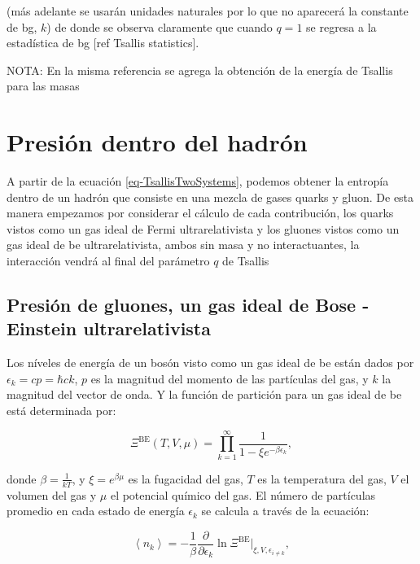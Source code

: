 (más adelante se usarán unidades naturales por lo que no aparecerá la constante de \acrshort{bg}, $k$) de donde se observa claramente que cuando $q=1$ se regresa a la estadística de \acrshort{bg} [ref Tsallis statistics].

NOTA: En la misma referencia se agrega la obtención de la energía de Tsallis para las masas

\section{Presión dentro del hadrón}\label{sec-PresTsa}

A partir de la ecuación \eqref{eq-TsallisTwoSystems}, podemos obtener la entropía dentro de un hadrón que consiste en una mezcla de gases quarks y gluon. De esta manera empezamos por considerar el cálculo de cada contribución, los quarks vistos como un gas ideal de Fermi ultrarelativista y los gluones vistos como un gas ideal de \acrfull{be}  ultrarelativista, ambos sin masa y no interactuantes, la interacción vendrá al final del parámetro $q$ de Tsallis

\subsection{Presión de gluones, un gas ideal de Bose - Einstein ultrarelativista}

Los níveles de energía de un bosón visto como un gas ideal de \acrshort{be} están dados por ${\epsilon}_{k}=cp=\hbar c k$, $p$ es la magnitud del momento de las partículas del gas, y $k$ la magnitud del vector de onda. Y la función de partición para un gas ideal de \acrshort{be} está determinada por:

\begin{equation}\label{eq-partfunc}
{\Xi}^{\mathrm{BE}}\left(T,V,\mu\right) = \prod_{k=1}^{\infty}\frac{1}{1-\xi {e}^{-\beta {\epsilon}_{k}}},
\end{equation}

donde $\beta = \frac{1}{kT}$, y ${\xi} = {e}^{\beta \mu}$ es la fugacidad del gas, $T$ es la temperatura del gas, $V$ el volumen del gas y $\mu$ el potencial químico del gas. El número de partículas promedio en cada estado de energía ${\epsilon}_{k}$ se calcula a través de la ecuación:

\begin{equation}\label{eq-avg-numb-parts}
\left\langle {n}_{k} \right\rangle = -\frac{1}{\beta} \frac{\partial}{\partial {\epsilon}_{k}} \ln {\Xi}^{\mathrm{BE}}\left.\right|_{\xi,V,{\epsilon}_{i \neq k}},
\end{equation}

